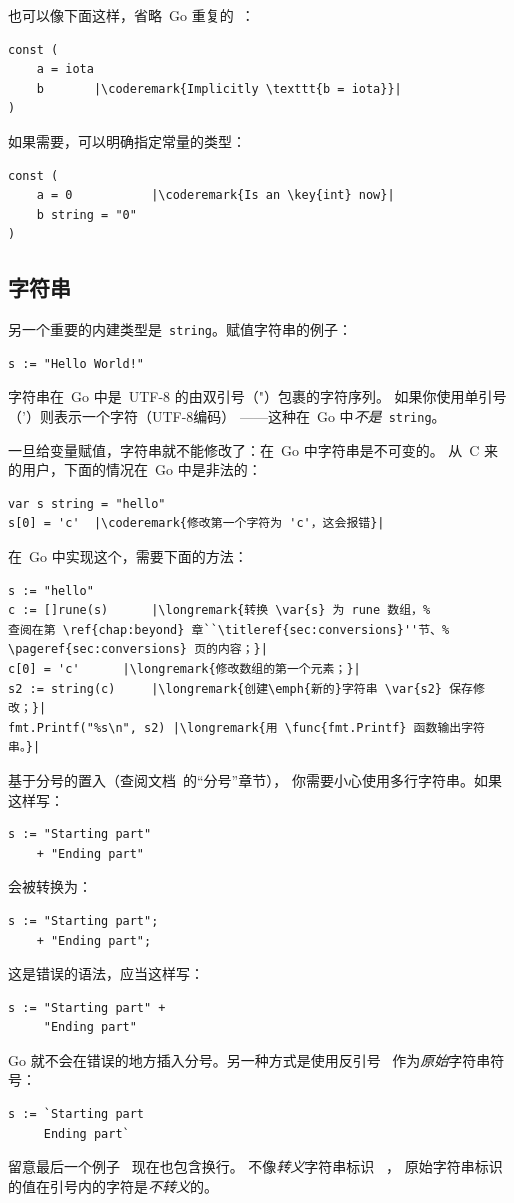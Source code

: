 也可以像下面这样，省略~Go 重复的~：
\begin{lstlisting}
const (
	a = iota
	b	    |\coderemark{Implicitly \texttt{b = iota}}|
)
\end{lstlisting}
如果需要，可以明确指定常量的类型：
\begin{lstlisting}
const (
	a = 0           |\coderemark{Is an \key{int} now}|
	b string = "0" 
)
\end{lstlisting}

\subsection{字符串}
另一个重要的内建类型是~\lstinline{string}。赋值字符串的例子：
\begin{lstlisting}
s := "Hello World!"
\end{lstlisting}
字符串在~Go 中是~UTF-8 的由双引号（"）包裹的字符序列。
如果你使用单引号（'）则表示一个字符（UTF-8编码）
——这种在~Go 中\emph{不是}~\lstinline{string}。

一旦给变量赋值，字符串就不能修改了：在~Go 中字符串是不可变的。
从~C 来的用户，下面的情况在~Go 中是非法的：
\begin{lstlisting}
var s string = "hello"
s[0] = 'c'  |\coderemark{修改第一个字符为 'c'，这会报错}|
\end{lstlisting}
在~Go 中实现这个，需要下面的方法：
\begin{lstlisting}
s := "hello"
c := []rune(s)	    |\longremark{转换 \var{s} 为 rune 数组，%
查阅在第 \ref{chap:beyond} 章``\titleref{sec:conversions}''节、%
\pageref{sec:conversions} 页的内容；}|
c[0] = 'c'	    |\longremark{修改数组的第一个元素；}|
s2 := string(c)     |\longremark{创建\emph{新的}字符串 \var{s2} 保存修改；}|
fmt.Printf("%s\n", s2) |\longremark{用 \func{fmt.Printf} 函数输出字符串。}|
\end{lstlisting}
\showremarks

\begin{lbar}[多行字符串]
基于分号的置入（查阅文档~\cite{effective_go}的``分号''章节），
你需要小心使用多行字符串。如果这样写：
\begin{lstlisting}
s := "Starting part"
    + "Ending part"
\end{lstlisting}
会被转换为：
\begin{lstlisting}
s := "Starting part";
    + "Ending part";
\end{lstlisting}
这是错误的语法，应当这样写：
\begin{lstlisting}
s := "Starting part" +
     "Ending part"
\end{lstlisting}
Go 就不会在错误的地方插入分号。另一种方式是使用反引号~ 作为\emph{原始}字符串符号：
\begin{lstlisting}
s := `Starting part
     Ending part`
\end{lstlisting}
留意最后一个例子~ 现在也包含换行。
不像\emph{转义}字符串标识~ ，
原始字符串标识的值在引号内的字符是\emph{不转义}的。
\end{lbar}

